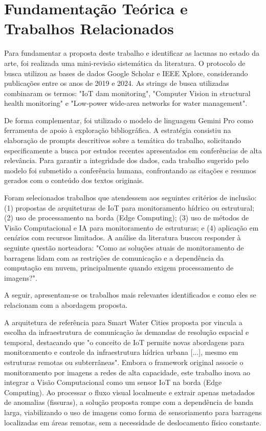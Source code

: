 \chapter{Fundamentação Teórica e Trabalhos Relacionados}
\label{cap:cap2}

Para fundamentar a proposta deste trabalho e identificar as lacunas no estado da arte, foi realizada uma mini-revisão sistemática da literatura. O protocolo de busca utilizou as bases de dados Google Scholar e IEEE Xplore, considerando publicações entre os anos de 2019 e 2024. As strings de busca utilizadas combinaram os termos: "IoT dam monitoring", "Computer Vision in structural health monitoring" e "Low-power wide-area networks for water management".

De forma complementar, foi utilizado o modelo de linguagem Gemini Pro como ferramenta de apoio à exploração bibliográfica. A estratégia consistiu na elaboração de prompts descritivos sobre a temática do trabalho, solicitando especificamente a busca por estudos recentes apresentados em conferências de alta relevância. Para garantir a integridade dos dados, cada trabalho sugerido pelo modelo foi submetido a conferência humana, confrontando as citações e resumos gerados com o conteúdo dos textos originais.

Foram selecionados trabalhos que atendessem aos seguintes critérios de inclusão: (1) propostas de arquiteturas de IoT para monitoramento hídrico ou estrutural; (2) uso de processamento na borda (Edge Computing); (3) uso de métodos de Visão Computacional e IA para monitoramento de estruturas; e (4) aplicação em cenários com recursos limitados. A análise da literatura buscou responder à seguinte questão norteadora: "Como as soluções atuais de monitoramento de barragens lidam com as restrições de comunicação e a dependência da computação em nuvem, principalmente quando exigem processamento de imagens?".

A seguir, apresentam-se os trabalhos mais relevantes identificados e como eles se relacionam com a abordagem proposta.

A arquitetura de referência para Smart Water Cities proposta por  vincula a escolha da infraestrutura de comunicação às demandas de resolução espacial e temporal, destacando que "o conceito de IoT permite novas abordagens para monitoramento e controle da infraestrutura hídrica urbana [...], mesmo em estruturas remotas ou subterrâneas". Embora o framework original associe o monitoramento por imagens a redes de alta capacidade, este trabalho inova ao integrar a Visão Computacional como um sensor IoT na borda (Edge Computing). Ao processar o fluxo visual localmente e extrair apenas metadados de anomalias (fissuras), a solução proposta rompe com a dependência de banda larga, viabilizando o uso de imagens como forma de sensoriamento para barragens localizadas em áreas remotas, sem a necessidade de deslocamento físico constante.

